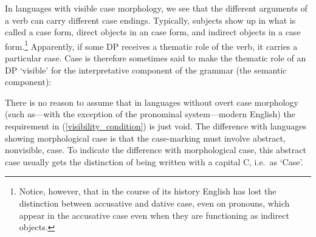 \documentclass{article}
\begin{document}
In languages with visible case morphology, we see that the different arguments of a verb can carry different case endings.
Typically, subjects show up in what is called a  case form, direct objects in an  case form, and indirect objects in a  case form.\footnote{Notice, however, that in the course of its history English has lost the distinction between accusative and dative case, even on pronouns, which appear in the accusative case even when they are functioning as indirect objects.}
Apparently, if some DP receives a thematic role of the verb, it carries a particular case.
Case is therefore sometimes said to make the thematic role of an DP ‘visible’ for the interpretative component of the grammar (the semantic component):
\begin{exe}
    \label{visibility_condition}
\end{exe}
There is no reason to assume that in languages without overt case morphology (such as---with the exception of the pronominal system---modern English) the requirement in (\ref{visibility_condition}) is just void.
The difference with languages showing morphological case is that the case-marking must involve abstract, nonvisible, case.
To indicate the difference with morphological case, this abstract case usually gets the distinction of being written with a capital C, i.e.\ as `Case'.
\end{document}
